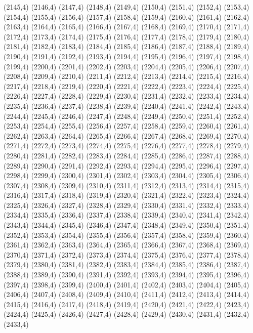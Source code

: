 (2145,4)
(2146,4)
(2147,4)
(2148,4)
(2149,4)
(2150,4)
(2151,4)
(2152,4)
(2153,4)
(2154,4)
(2155,4)
(2156,4)
(2157,4)
(2158,4)
(2159,4)
(2160,4)
(2161,4)
(2162,4)
(2163,4)
(2164,4)
(2165,4)
(2166,4)
(2167,4)
(2168,4)
(2169,4)
(2170,4)
(2171,4)
(2172,4)
(2173,4)
(2174,4)
(2175,4)
(2176,4)
(2177,4)
(2178,4)
(2179,4)
(2180,4)
(2181,4)
(2182,4)
(2183,4)
(2184,4)
(2185,4)
(2186,4)
(2187,4)
(2188,4)
(2189,4)
(2190,4)
(2191,4)
(2192,4)
(2193,4)
(2194,4)
(2195,4)
(2196,4)
(2197,4)
(2198,4)
(2199,4)
(2200,4)
(2201,4)
(2202,4)
(2203,4)
(2204,4)
(2205,4)
(2206,4)
(2207,4)
(2208,4)
(2209,4)
(2210,4)
(2211,4)
(2212,4)
(2213,4)
(2214,4)
(2215,4)
(2216,4)
(2217,4)
(2218,4)
(2219,4)
(2220,4)
(2221,4)
(2222,4)
(2223,4)
(2224,4)
(2225,4)
(2226,4)
(2227,4)
(2228,4)
(2229,4)
(2230,4)
(2231,4)
(2232,4)
(2233,4)
(2234,4)
(2235,4)
(2236,4)
(2237,4)
(2238,4)
(2239,4)
(2240,4)
(2241,4)
(2242,4)
(2243,4)
(2244,4)
(2245,4)
(2246,4)
(2247,4)
(2248,4)
(2249,4)
(2250,4)
(2251,4)
(2252,4)
(2253,4)
(2254,4)
(2255,4)
(2256,4)
(2257,4)
(2258,4)
(2259,4)
(2260,4)
(2261,4)
(2262,4)
(2263,4)
(2264,4)
(2265,4)
(2266,4)
(2267,4)
(2268,4)
(2269,4)
(2270,4)
(2271,4)
(2272,4)
(2273,4)
(2274,4)
(2275,4)
(2276,4)
(2277,4)
(2278,4)
(2279,4)
(2280,4)
(2281,4)
(2282,4)
(2283,4)
(2284,4)
(2285,4)
(2286,4)
(2287,4)
(2288,4)
(2289,4)
(2290,4)
(2291,4)
(2292,4)
(2293,4)
(2294,4)
(2295,4)
(2296,4)
(2297,4)
(2298,4)
(2299,4)
(2300,4)
(2301,4)
(2302,4)
(2303,4)
(2304,4)
(2305,4)
(2306,4)
(2307,4)
(2308,4)
(2309,4)
(2310,4)
(2311,4)
(2312,4)
(2313,4)
(2314,4)
(2315,4)
(2316,4)
(2317,4)
(2318,4)
(2319,4)
(2320,4)
(2321,4)
(2322,4)
(2323,4)
(2324,4)
(2325,4)
(2326,4)
(2327,4)
(2328,4)
(2329,4)
(2330,4)
(2331,4)
(2332,4)
(2333,4)
(2334,4)
(2335,4)
(2336,4)
(2337,4)
(2338,4)
(2339,4)
(2340,4)
(2341,4)
(2342,4)
(2343,4)
(2344,4)
(2345,4)
(2346,4)
(2347,4)
(2348,4)
(2349,4)
(2350,4)
(2351,4)
(2352,4)
(2353,4)
(2354,4)
(2355,4)
(2356,4)
(2357,4)
(2358,4)
(2359,4)
(2360,4)
(2361,4)
(2362,4)
(2363,4)
(2364,4)
(2365,4)
(2366,4)
(2367,4)
(2368,4)
(2369,4)
(2370,4)
(2371,4)
(2372,4)
(2373,4)
(2374,4)
(2375,4)
(2376,4)
(2377,4)
(2378,4)
(2379,4)
(2380,4)
(2381,4)
(2382,4)
(2383,4)
(2384,4)
(2385,4)
(2386,4)
(2387,4)
(2388,4)
(2389,4)
(2390,4)
(2391,4)
(2392,4)
(2393,4)
(2394,4)
(2395,4)
(2396,4)
(2397,4)
(2398,4)
(2399,4)
(2400,4)
(2401,4)
(2402,4)
(2403,4)
(2404,4)
(2405,4)
(2406,4)
(2407,4)
(2408,4)
(2409,4)
(2410,4)
(2411,4)
(2412,4)
(2413,4)
(2414,4)
(2415,4)
(2416,4)
(2417,4)
(2418,4)
(2419,4)
(2420,4)
(2421,4)
(2422,4)
(2423,4)
(2424,4)
(2425,4)
(2426,4)
(2427,4)
(2428,4)
(2429,4)
(2430,4)
(2431,4)
(2432,4)
(2433,4)
